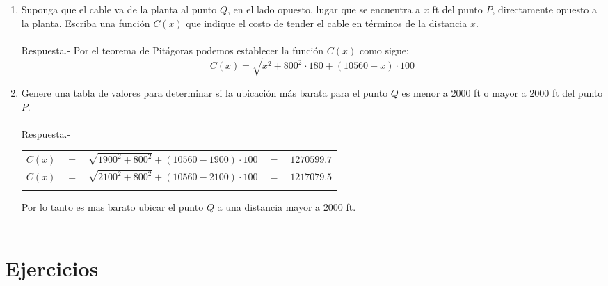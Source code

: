 \begin{enumerate}
\begin{enumerate}[\bfseries a.]
	\item Suponga que el cable va de la planta al punto $Q$, en el lado opuesto, lugar que se encuentra a $x$ ft del punto $P$, directamente opuesto a la planta. Escriba una función $C(x)$ que indique el costo de tender el cable en términos de la distancia $x$.\\\\
	    Respuesta.-\; Por el teorema de Pitágoras podemos establecer la función $C(x)$ como sigue: $$C(x)=\sqrt{x^2 + 800^2} \cdot 180 + (10560-x)\cdot 100$$

	\item Genere una tabla de valores para determinar si la ubicación más barata para el punto $Q$ es menor a $2000$ ft o mayor a $2000$ ft del punto $P$.\\\\
	    Respuesta.-\;
	    \begin{center}
		\begin{tabular}{rclcl}
		    $C(x)$&$=$&$\sqrt{1900^2+800^2} + (10560-1900)\cdot 100$&$=$&$1270599.7$\\
		    $C(x)$&$=$&$\sqrt{2100^2+800^2} + (10560-2100)\cdot 100$&$=$&$1217079.5$\\\\
		\end{tabular}
	    \end{center}
	    Por lo tanto es mas barato ubicar el punto $Q$ a una distancia mayor a $2000$ ft.\\\\

    \end{enumerate}

\end{enumerate}

\section{Ejercicios}

